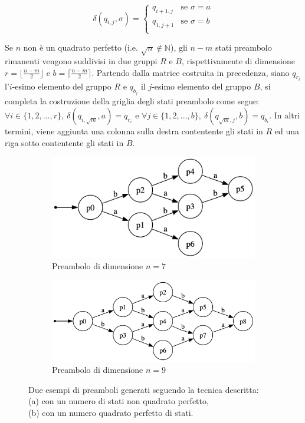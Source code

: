 \documentclass[a4paper,12pt]{report} %
\begin{document}
\begin{equation*}
  \delta(q_{i,j}, \sigma) =
  \begin{cases}
    q_{i+1,j} & \text{se } \sigma = a \\
    q_{1,j+1} & \text{se } \sigma = b \\
  \end{cases}
\end{equation*}

Se $n$ non è un quadrato perfetto (i.e. $\sqrt{n} \notin \mathbb{N}$), gli $n - m$ stati preambolo rimanenti 
vengono suddivisi in due gruppi $R$ e $B$, rispettivamente di dimensione $r = \lfloor \frac{n - m}{2} \rfloor$ e 
$b = \lceil \frac{n - m}{2} \rceil$. Partendo dalla matrice costruita in precedenza, siano $q_{r_i}$ l'$i$-esimo elemento 
del gruppo $R$ e $q_{b_j}$ il $j$-esimo elemento del gruppo $B$, si completa la costruzione della griglia degli
stati preambolo come segue: $\forall i \in \{1, 2, ..., r\}, \ \delta(q_{i, \sqrt{m}}, a) = q_{r_i}$ e 
$\forall j \in \{1, 2, ..., b\}, \ \delta(q_{\sqrt{m}, j}, b) = q_{b_i}$. In altri termini, viene aggiunta una colonna
sulla destra contentente gli stati in $R$ ed una riga sotto contentente gli stati in $B$.

\begin{figure}[!htb]
  \begin{subfigure}[h]{0.39\linewidth}
    \includegraphics[width=\linewidth]{images/p_gen_dfa.png}
    \caption{Preambolo di dimensione $n=7$}
  \end{subfigure}
  \hfill
  \begin{subfigure}[h]{0.5\linewidth}
    \includegraphics[width=\linewidth]{images/perf_square_p_gen_dfa.png}
    \caption{Preambolo di dimensione $n=9$}
  \end{subfigure}
  \caption{Due esempi di preamboli generati seguendo la tecnica descritta: \\
  (a) con un numero di stati non quadrato perfetto, \\(b) con un numero quadrato perfetto di stati.}
\end{figure}
\end{document}
